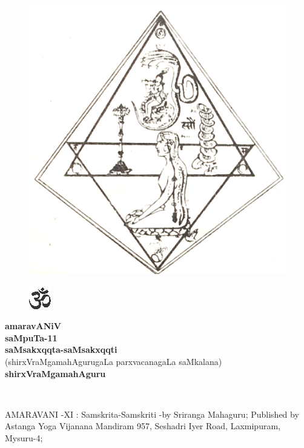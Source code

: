 \begin{figure}[h]
\centering
{\includegraphics[scale=.18]{0000b.eps}}
\end{figure}

\begin{figure}[h]
\centering
{\includegraphics[scale=1]{om1.eps}}
\end{figure}

\bigskip
\begin{center}
{\Huge\bf amaravANiV}\\[15pt]
{\Large\bf saMpuTa-11}\\[15pt]
{\Huge\bf saMsakxqqta-saMsakxqqti}\\[15pt]
{(shirxVraMgamahAgurugaLa parxvacanagaLa saMkalana)}\\[25pt]
{\Huge\bf shirxVraMgamahAguru}
\end{center}


\vfill
\eject

\thispagestyle{empty}
~\phantom{a}

{\rm AMARAVANI -XI : Samskrita-Samskriti -by Sriranga Mahaguru; Published by Astanga Yoga Vijanana Mandiram 957, Seshadri Iyer Road, Laxmipuram, Mysuru-4;}

